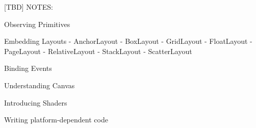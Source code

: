 
[TBD] NOTES:

Observing Primitives

Embedding Layouts
- AnchorLayout
- BoxLayout
- GridLayout
- FloatLayout
- PageLayout
- RelativeLayout
- StackLayout
- ScatterLayout

Binding Events

Understanding Canvas

Introducing Shaders

Writing platform-dependent code
